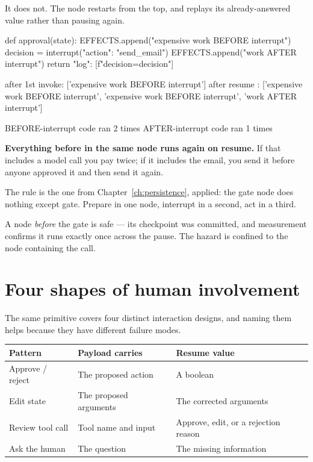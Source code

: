 It does not. The node restarts from the top, and  replays its
already-answered value rather than pausing again.

\begin{python}[caption={The measurement}, label={lst:interrupt-trap}]
def approval(state):
    EFFECTS.append("expensive work BEFORE interrupt")
    decision = interrupt({"action": "send_email"})
    EFFECTS.append("work AFTER interrupt")
    return {"log": [f"decision={decision}"]}
\end{python}

\begin{console}
after 1st invoke: ['expensive work BEFORE interrupt']
after resume    : ['expensive work BEFORE interrupt',
                   'expensive work BEFORE interrupt',
                   'work AFTER interrupt']

BEFORE-interrupt code ran 2 times
AFTER-interrupt  code ran 1 times
\end{console}

\begin{warning}
\textbf{Everything before  in the same node runs again on
resume.} If that includes a model call you pay twice; if it includes the email,
you send it before anyone approved it and then send it again.

The rule is the one from Chapter~\ref{ch:persistence}, applied: the gate node
does nothing except gate. Prepare in one node, interrupt in a second, act in a
third.
\end{warning}

A node \emph{before} the gate is safe --- its checkpoint was committed, and
measurement confirms it runs exactly once across the pause. The hazard is
confined to the node containing the  call.

\section{Four shapes of human involvement}
\label{sec:hitl-patterns}

The same primitive covers four distinct interaction designs, and naming them
helps because they have different failure modes.

\begin{center}
\small
\begin{tabularx}{\linewidth}{@{}lXX@{}}
\toprule
\textbf{Pattern} & \textbf{Payload carries} & \textbf{Resume value} \\
\midrule
Approve / reject & The proposed action & A boolean \\[3pt]
Edit state & The proposed arguments & The corrected arguments \\[3pt]
Review tool call & Tool name and input & Approve, edit, or a rejection reason \\[3pt]
Ask the human & The question & The missing information \\
\bottomrule
\end{tabularx}
\end{center}

